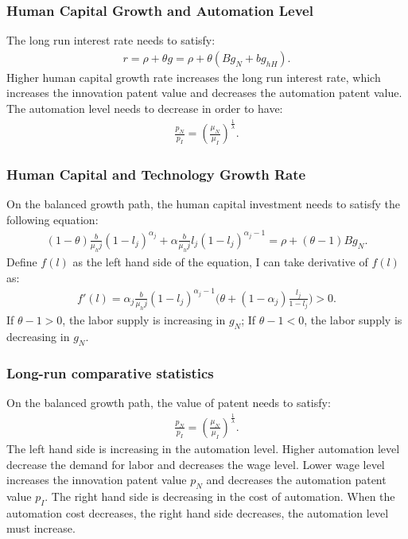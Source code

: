 \documentclass[12pt]{article}
\begin{document}
\begin{appendices}
\subsubsection*{Human Capital Growth and Automation Level}
The long run interest rate needs to satisfy: 
\begin{align*}
r = \rho+\theta g = \rho+\theta(Bg_N+bg_{hH}).
\end{align*}
Higher human capital growth rate increases the long run interest rate, which increases the innovation patent value and decreases the automation patent value. The automation level needs to decrease in order to have: 
\begin{align*}
\frac{p_N}{p_I} = (\frac{\mu_N}{\mu_I})^{\frac{1}{\lambda}}.
\end{align*} 
 
\subsubsection*{Human Capital and Technology Growth Rate}
On the balanced growth path, the human capital investment needs to satisfy the following equation: 
\begin{align*}
(1-\theta)\frac{b}{\mu_hj}(1-l_j)^{\alpha_j}+\alpha\frac{b}{\mu_hj}l_j(1-l_j)^{\alpha_j-1} = \rho+(\theta-1)Bg_N.
\end{align*}
Define $f(l)$ as the left hand side of the equation, I can take derivative of $f(l)$ as:
\begin{align*}
f'(l) = \alpha_j\frac{b}{\mu_hj}(1-l_j)^{\alpha_j-1}\big(\theta+(1-\alpha_j)\frac{l_j}{1-l_j}\big)>0.
\end{align*}
If $\theta-1>0$, the labor supply is increasing in $g_N$; If $\theta-1<0$, the labor supply is decreasing in $g_N$. 

\subsubsection*{Long-run comparative statistics}
On the balanced growth path, the value of patent needs to satisfy: 
\begin{align*}
\frac{p_N}{p_I} = (\frac{\mu_N}{\mu_I})^{\frac{1}{\lambda}}.
\end{align*} 
The left hand side is increasing in the automation level. Higher automation level decrease the demand for labor and decreases the wage level. Lower wage level increases the innovation patent value $p_N$ and decreases the automation patent value $p_I$. The right hand side is decreasing in the cost of automation. When the automation cost decreases, the right hand side decreases, the automation level must increase. 


\end{appendices}
\end{document}
